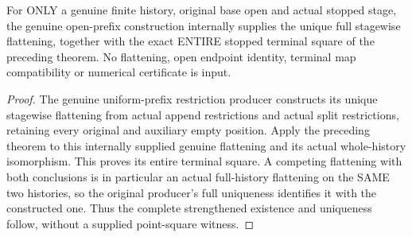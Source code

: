 \begin{theorem}
\label{hir:sharp-actual-curve-stopped-prefix-open-terminal-natural}
\leanok
For ONLY a genuine finite history, original base open and actual stopped
stage, the genuine open-prefix construction internally supplies the
unique full stagewise flattening, together with the exact ENTIRE stopped
terminal square of the preceding theorem. No flattening, open endpoint
identity, terminal map compatibility or numerical certificate is input.
\end{theorem}
\begin{proof}
The genuine uniform-prefix restriction producer constructs its unique
stagewise flattening from actual append restrictions and actual split
restrictions, retaining every original and auxiliary empty position.
Apply the preceding theorem to this internally supplied genuine
flattening and its actual whole-history isomorphism. This proves its
entire terminal square. A competing flattening with both conclusions
is in particular an actual full-history flattening on the SAME two
histories, so the original producer's full uniqueness identifies it
with the constructed one. Thus the complete strengthened existence
and uniqueness follow, without a supplied point-square witness.
\end{proof}
